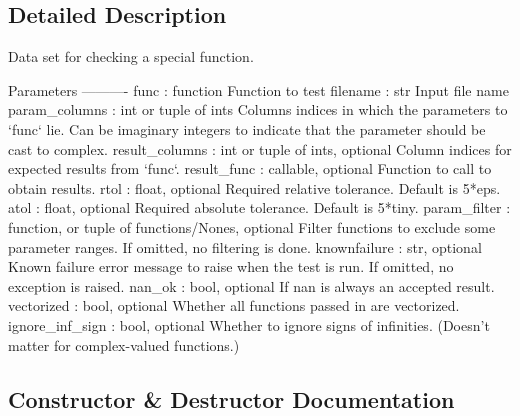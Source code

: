 \subsection{Detailed Description}
\begin{DoxyVerb}Data set for checking a special function.

Parameters
----------
func : function
    Function to test
filename : str
    Input file name
param_columns : int or tuple of ints
    Columns indices in which the parameters to `func` lie.
    Can be imaginary integers to indicate that the parameter
    should be cast to complex.
result_columns : int or tuple of ints, optional
    Column indices for expected results from `func`.
result_func : callable, optional
    Function to call to obtain results.
rtol : float, optional
    Required relative tolerance. Default is 5*eps.
atol : float, optional
    Required absolute tolerance. Default is 5*tiny.
param_filter : function, or tuple of functions/Nones, optional
    Filter functions to exclude some parameter ranges.
    If omitted, no filtering is done.
knownfailure : str, optional
    Known failure error message to raise when the test is run.
    If omitted, no exception is raised.
nan_ok : bool, optional
    If nan is always an accepted result.
vectorized : bool, optional
    Whether all functions passed in are vectorized.
ignore_inf_sign : bool, optional
    Whether to ignore signs of infinities.
    (Doesn't matter for complex-valued functions.)\end{DoxyVerb}
 

\subsection{Constructor \& Destructor Documentation}
\hypertarget{classscipy_1_1special_1_1__testutils_1_1FuncData_a77c2591d1f290105364dadb100c592fb}{}

